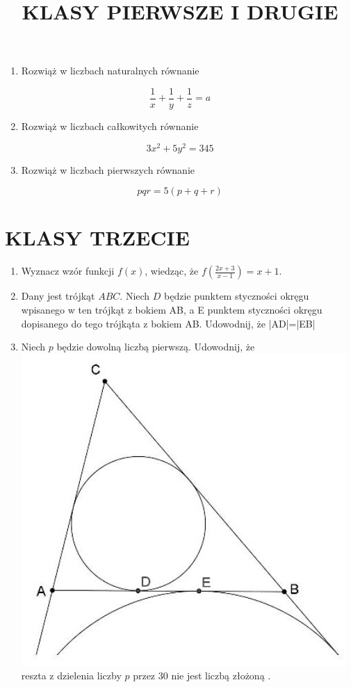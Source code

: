 \documentclass[10pt]{article}
\title{KLASY PIERWSZE I DRUGIE }
\author{}
\date{}
\begin{document}
\maketitle
\begin{enumerate}
  \item Rozwiąż w liczbach naturalnych równanie
\end{enumerate}

\[
\frac{1}{x}+\frac{1}{y}+\frac{1}{z}=a
\]

\begin{enumerate}
  \setcounter{enumi}{1}
  \item Rozwiąż w liczbach całkowitych równanie
\end{enumerate}

\[
3 x^{2}+5 y^{2}=345
\]

\begin{enumerate}
  \setcounter{enumi}{2}
  \item Rozwiąż w liczbach pierwszych równanie
\end{enumerate}

\[
p q r=5(p+q+r)
\]

\section*{KLASY TRZECIE}
\begin{enumerate}
  \item Wyznacz wzór funkcji \(f(x)\), wiedząc, że \(f\left(\frac{2 x+3}{x-1}\right)=x+1\).
  \item Dany jest trójkąt \(A B C\). Niech \(D\) będzie punktem styczności okręgu wpisanego w ten trójkąt z bokiem AB, a E punktem styczności okręgu dopisanego do tego trójkąta z bokiem AB. Udowodnij, że |AD|=|EB|
  \item Niech \(p\) będzie dowolną liczbą pierwszą. Udowodnij, że\\
\includegraphics[max width=\textwidth, center]{2024_11_21_8a513b02f26bec178ccdg-1}\\
reszta z dzielenia liczby \(p\) przez 30 nie jest liczbą złożoną .
\end{enumerate}
\end{document}
